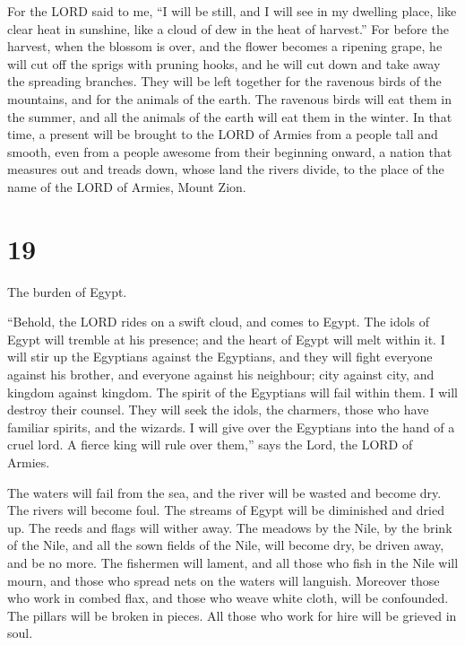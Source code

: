 For the LORD said to me, ``I will be still, and I will
see in my dwelling place, like clear heat in sunshine, like a cloud of
dew in the heat of harvest.''  For before the harvest,
when the blossom is over, and the flower becomes a ripening grape, he
will cut off the sprigs with pruning hooks, and he will cut down and
take away the spreading branches.  They will be left
together for the ravenous birds of the mountains, and for the animals of
the earth. The ravenous birds will eat them in the summer, and all the
animals of the earth will eat them in the winter.  In that
time, a present will be brought to the LORD of Armies from a people tall
and smooth, even from a people awesome from their beginning onward, a
nation that measures out and treads down, whose land the rivers divide,
to the place of the name of the LORD of Armies, Mount Zion.

\hypertarget{section-18}{%
\section{19}\label{section-18}}

 The burden of Egypt.

``Behold, the LORD rides on a swift cloud, and comes to Egypt. The idols
of Egypt will tremble at his presence; and the heart of Egypt will melt
within it.  I will stir up the Egyptians against the
Egyptians, and they will fight everyone against his brother, and
everyone against his neighbour; city against city, and kingdom against
kingdom.  The spirit of the Egyptians will fail within
them. I will destroy their counsel. They will seek the idols, the
charmers, those who have familiar spirits, and the wizards.
 I will give over the Egyptians into the hand of a cruel
lord. A fierce king will rule over them,'' says the Lord, the LORD of
Armies.

 The waters will fail from the sea, and the river will be
wasted and become dry.  The rivers will become foul. The
streams of Egypt will be diminished and dried up. The reeds and flags
will wither away.  The meadows by the Nile, by the brink
of the Nile, and all the sown fields of the Nile, will become dry, be
driven away, and be no more.  The fishermen will lament,
and all those who fish in the Nile will mourn, and those who spread nets
on the waters will languish.  Moreover those who work in
combed flax, and those who weave white cloth, will be confounded.
 The pillars will be broken in pieces. All those who work
for hire will be grieved in soul.

